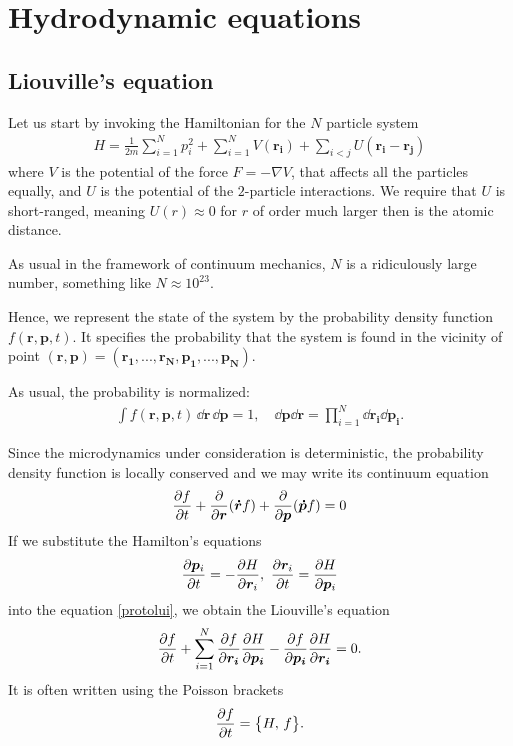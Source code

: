 \chapter{Hydrodynamic equations}
\section{Liouville's equation}
Let us start by invoking the Hamiltonian for the $N$ particle system
\begin{align*}
H = \frac{1}{2m} \sum_{i=1}^N p_i^2 + \sum_{i=1}^N V(\bm{r_i}) + \sum_{i<j} U(\bm{r_i} - \bm{r_j})
\end{align*}
where $V$ is the potential of the force $F= -\nabla V$, that affects all the particles equally, and $U$ is the potential of the $2$-particle interactions. We require that $U$ is short-ranged, meaning $U(r) \approx 0$ for $r$ of order much larger then is the atomic distance.

As usual in the framework of continuum mechanics, $N$ is a ridiculously large number, something like $N \approx 10^{23}$.

Hence, we represent the state of the system by the probability density function $f(\bm{r},\bm{p},t)$. It specifies the probability that the system is found in the vicinity of point $(\bm{r},\bm{p}) = (\bm{r_1},...,\bm{r_N},\bm{p_1},...,\bm{p_N})$.

As usual, the probability is normalized:
\begin{align*}
\int f(\bm{r},\bm{p},t) \, \dd\bm{r} \, \dd\bm{p} = 1, \quad \dd\bm{p} \dd\bm{r} = \prod_{i=1}^N \dd \bm{r_i} \dd \bm{p_i}.
\end{align*}

Since the microdynamics under consideration is deterministic, the probability density function is locally conserved and we may write its continuum equation
\begin{align} \label{protolui}
\frac{\partial f}{\partial t} + \frac{\partial}{\partial \bm{r}} (\bm{\dot{r}} f) + \frac{\partial}{\partial \bm{p}} (\bm{\dot{p}} f) = 0
\end{align}
If we substitute the Hamilton's equations 
\begin{align*}
\frac{\partial \bm{p}_i}{\partial t} = - \frac{\partial H}{\partial \bm{r}_i},~ \frac{\partial \bm{r}_i}{\partial t} = \frac{\partial H}{\partial \bm{p}_i}
\end{align*}
into the equation \ref{protolui}, we obtain the Liouville's equation
\begin{align*}
\frac{\partial f}{\partial t} + \sum_{i=1}^N \frac{\partial f}{\partial \bm{r_i}} \frac{\partial H}{\partial \bm{p_i}} - \frac{\partial f}{\partial \bm{p_i}}\frac{\partial H}{\partial \bm{r_i}} = 0.
\end{align*}
It is often written using the Poisson brackets
\begin{align} \label{lui}
\frac{\partial f}{\partial t} = \big\{ H, \, f \big\}.
\end{align}

